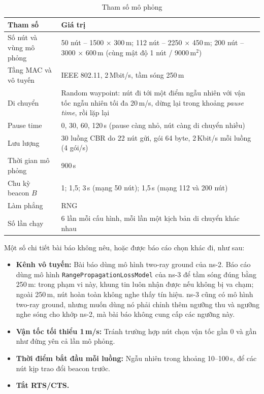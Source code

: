 \documentclass[a4paper,13pt]{extreport}
\begin{document}
\begin{table}[H]
\centering
\caption{Tham số mô phỏng}
\label{tab:params}
\begin{tabularx}{\textwidth}{>{\raggedright\arraybackslash}p{4.2cm} L}
\toprule
Tham số & Giá trị\\
\midrule
Số nút và vùng mô phỏng & 50 nút -- 1500 × 300\,m; 112 nút -- 2250 × 450\,m; 200 nút -- 3000 × 600\,m (cùng mật độ 1 nút / 9000\,m$^2$)\\
Tầng MAC và vô tuyến & IEEE 802.11, 2\,Mbit/s, tầm sóng 250\,m\\
Di chuyển & Random waypoint: nút đi tới một điểm ngẫu nhiên với vận tốc ngẫu nhiên tối đa 20\,m/s, dừng lại trong khoảng \textit{pause time}, rồi lặp lại\\
Pause time & 0, 30, 60, 120\,s (pause càng nhỏ, nút càng di chuyển nhiều)\\
Lưu lượng & 30 luồng CBR do 22 nút gửi, gói 64 byte, 2\,Kbit/s mỗi luồng (4 gói/s)\\
Thời gian mô phỏng & 900\,s\\
Chu kỳ beacon $B$ & 1; 1,5; 3\,s (mạng 50 nút); 1,5\,s (mạng 112 và 200 nút)\\
Làm phẳng & RNG\\
Số lần chạy & 6 lần mỗi cấu hình, mỗi lần một kịch bản di chuyển khác nhau\\
\bottomrule
\end{tabularx}
\end{table}

Một số chi tiết bài báo không nêu, hoặc được báo cáo chọn khác đi, như sau:
\begin{itemize}
  \item \textbf{Kênh vô tuyến:} Bài báo dùng mô hình two-ray ground của ns-2. Báo cáo dùng mô hình \texttt{RangePropagationLossModel} của ns-3 để tầm sóng đúng bằng 250\,m: trong phạm vi này, khung tin luôn nhận được nếu không bị va chạm; ngoài 250\,m, nút hoàn toàn không nghe thấy tín hiệu. ns-3 cũng có mô hình two-ray ground, nhưng muốn dùng nó phải chỉnh thêm ngưỡng thu và ngưỡng nghe sóng cho khớp ns-2, mà bài báo không cung cấp các ngưỡng này.
  \item \textbf{Vận tốc tối thiểu 1\,m/s:} Tránh trường hợp nút chọn vận tốc gần 0 và gần như đứng yên cả lần mô phỏng.
  \item \textbf{Thời điểm bắt đầu mỗi luồng:} Ngẫu nhiên trong khoảng 10--100\,s, để các nút kịp trao đổi beacon trước.
  \item \textbf{Tắt RTS/CTS.}
\end{itemize}
\end{document}
